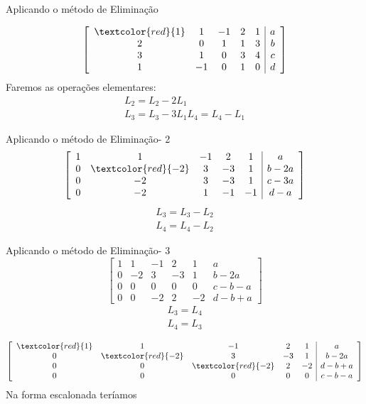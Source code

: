 \documentclass{beamer}
\begin{document}
\begin{frame}{Aplicando o método de Eliminação}

  $$
  \left[ \begin{array}{ccccc|c}
     \textcolor{red}{1} & 1 & -1 & 2 & 1 & a \\ 
     2 & 0 & 1 &1 & 3 & b \\
     3 & 1 & 0 & 3 & 4 & c \\
     1 & -1 & 0 & 1 & 0 & d
     \end{array}\right]
 $$
Faremos as operações elementares:
\begin{gather*}  
  L_2 = L_2-2L_1 \\
  L_3 = L_3 -3L_1
  L_4 = L_4 - L_1
\end{gather*}
\end{frame}


\begin{frame}{Aplicando o método de Eliminação- 2 }
  $$
  \left[ \begin{array}{ccccc|c}
     1 & 1 & -1 & 2 & 1 & a \\ 
      0 & \textcolor{red}{-2} & 3 &-3 & 1 & b-2a \\
     0 & -2 & 3 & -3 & 1 & c-3a \\
     0 & -2 & 1 & -1 & -1 & d -a
     \end{array}\right]
 $$
 \begin{gather*}  
  L_3 = L_3- L_2 \\
  L_4 = L_4 - L_2
\end{gather*}
\end{frame}

\begin{frame}{Aplicando o método de Eliminação- 3 }
  $$
  \left[ \begin{array}{ccccc|c}
     1 & 1 & -1 & 2 & 1 & a \\ 
      0 & -2 & 3 &-3 & 1 & b-2a \\
     0 & 0 & 0 & 0 & 0 & c-b-a \\
     0 & 0 & -2 & 2 & -2 & d -b + a
     \end{array}\right]
 $$
 \begin{gather*}  
  L_3 = L_4 \\
  L_4 =L_3
\end{gather*}
\end{frame}

\begin{frame}

  $$
  \left[ \begin{array}{ccccc|c}
     \textcolor{red}{1} & 1 & -1 & 2 & 1 & a \\ 
      0 & \textcolor{red}{-2} & 3 &-3 & 1 & b-2a \\
      0 & 0 & \textcolor{red}{-2} & 2 & -2 & d -b + a \\
      0 & 0 & 0 & 0 & 0 & c-b-a \\
     \end{array}\right]
 $$
Na forma escalonada teríamos
\end{frame}
\end{document}
